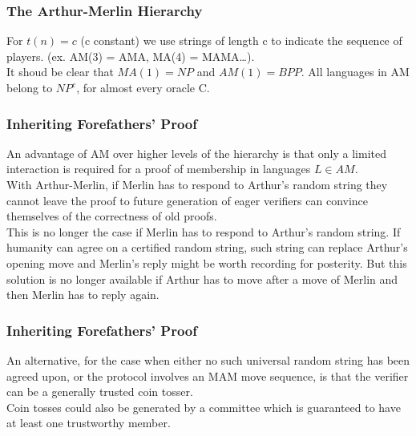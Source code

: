 \documentclass{beamer}
\begin{document}
\begin{frame}
\frametitle{The Arthur-Merlin Hierarchy}
For $t(n) = c$ (c constant) we use strings of length c to indicate the sequence of players. (ex. AM(3) = AMA, MA(4) = MAMA\ldots).\\
It shoud be clear that $MA(1) = NP$ and $AM(1) = BPP$. 
All languages in AM belong to $NP^c$, for almost every oracle C.
\end{frame}

\begin{frame}
\frametitle{Inheriting Forefathers' Proof}
An advantage of AM over higher levels of the hierarchy is that only a limited interaction is required for a proof of membership in languages $L \in AM$.\\
With Arthur-Merlin, if Merlin has to respond to Arthur's random string they cannot leave the proof to future generation of eager verifiers can convince themselves of the correctness of old proofs.\\
This is no longer the case if Merlin has to respond to Arthur's random string. If humanity can agree on a certified random string, such string can replace Arthur's opening move and Merlin's reply might be worth recording for posterity.
But this solution is no longer available if Arthur has to move after a move of Merlin and then Merlin has to reply again.\\
\end{frame}

\begin{frame}
\frametitle{Inheriting Forefathers' Proof}
An alternative, for the case when either no such universal random string has been agreed upon, or the protocol involves an MAM move sequence, is that the verifier can be a generally trusted coin tosser.\\
Coin tosses could also be generated by a committee which is guaranteed to have at least one trustworthy member.

\end{frame}

\end{document}
